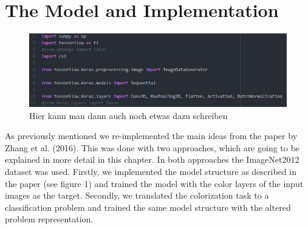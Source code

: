 \documentclass[12pt,letterpaper]{article}
\begin{document}
\section{The Model and Implementation}
\begin{figure}[ht]
	\centering
	\includegraphics[width=1.0\textwidth]{bsp.png}
	\caption{Hier kann man dann auch noch etwas dazu schreiben}
	\label{bsp}
\end{figure}
As previously mentioned we re-implemented the main ideas from the paper by Zhang et al. (2016). This was done with two approaches, which are going to be explained in more detail in this chapter. In both approaches the ImageNet2012 dataset was used. Firstly, we implemented the model structure as described in the paper (see figure 1) and trained the model with the color layers of the input images as the target. Secondly, we translated the colorization task to a classification problem and trained the same model structure with the altered problem representation.
\end{document}
